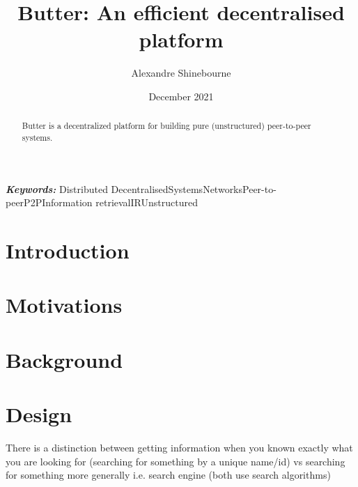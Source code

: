 \documentclass[a4paper]{article}
\title{Butter: An efficient decentralised platform}
\author{Alexandre Shinebourne}
\date{December 2021}
\providecommand{\keywords}[1]
{
    \small
    \textbf{\textit{Keywords: }} #1
}
\begin{document}
\maketitle

\begin{abstract}
    Butter is a decentralized platform for building pure (unstructured) peer-to-peer systems.
\end{abstract}

\keywords{Distributed}{Decentralised}{Systems}{Networks}{Peer-to-peer}{P2P}{Information retrieval}{IR}{Unstructured}

\tableofcontents



\section{Introduction}
\section{Motivations}
\section{Background}
\section{Design}
There is a distinction between getting information when you known exactly what you are looking for (searching for something by a unique name/id) vs searching for something more generally i.e. search engine (both use search algorithms)
\end{document}
